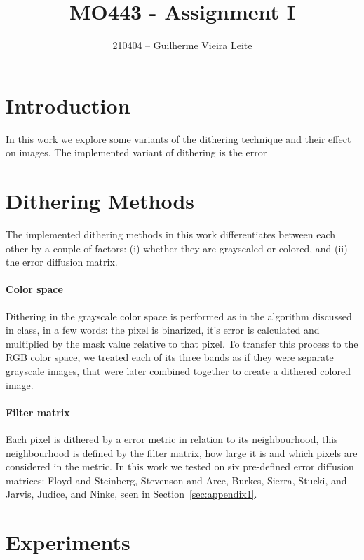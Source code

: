 \documentclass[conference]{IEEEtran}
\begin{document}
\title{MO443 - Assignment I}

\author{210404 -- Guilherme Vieira Leite}

\maketitle

\section{Introduction}

In this work we explore some variants of the dithering technique and their effect on images. The implemented variant of dithering is the error

\section{Dithering Methods}
\label{sec:method}

The implemented dithering methods in this work differentiates between each other by a couple of factors: (i) whether they are grayscaled or colored, and (ii) the error diffusion matrix.

\paragraph{Color space} Dithering in the grayscale color space is performed as in the algorithm discussed in class, in a few words: the pixel is binarized, it's error is calculated and multiplied by the mask value relative to that pixel. To transfer this process to the RGB color space, we treated each of its three bands as if they were separate grayscale images, that were later combined together to create a dithered colored image.

\paragraph{Filter matrix} Each pixel is dithered by a error metric in relation to its neighbourhood, this neighbourhood is defined by the filter matrix, how large it is and which pixels are considered in the metric. In this work we tested on six pre-defined error diffusion matrices: Floyd and Steinberg, Stevenson and Arce, Burkes, Sierra, Stucki, and Jarvis, Judice, and Ninke, seen in Section~\ref{sec:appendix1}.

\section{Experiments}
\end{document}
